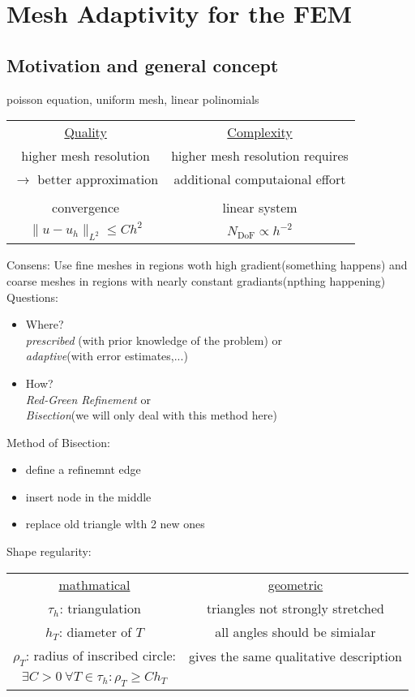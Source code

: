 \section{Mesh Adaptivity for the FEM}
\subsection{Motivation and general concept}

\begin{example}
	poisson equation, uniform mesh, linear polinomials
\end{example}

\begin{tabular}{c | c}
	\underline{Quality} & \underline{Complexity}\\
	higher mesh resolution & higher mesh resolution requires \\
	 $\to$ better approximation & additional computaional effort\\
	 & \\
	 convergence & linear system \\
	 $\|u-u_h\|_{L^2} \leq C h^2$ & $N_{\text{DoF}}\propto h^{-2}$
\end{tabular}

Consens: Use fine meshes in regions woth high gradient(something happens) and coarse meshes in regions with nearly constant gradiants(npthing happening)\\

Questions:
\begin{itemize}
	\item Where?\\
		\textit{prescribed} (with prior knowledge of the problem) or \\
		\textit{adaptive}(with error estimates,...)
	\item How?\\
		\textit{Red-Green Refinement} or \\
		\textit{Bisection}(we will only deal with this method here)
\end{itemize}

Method of Bisection:
\begin{itemize}
	\item define a refinemnt edge
	\item insert node in the middle
	\item replace old triangle wlth 2 new ones 
\end{itemize}

Shape regularity:\\
\begin{tabular}{c | c}
	\underline{mathmatical} & \underline{geometric}\\
	$\tau_h$:  triangulation & triangles not strongly stretched \\
	$h_T$:  diameter of $T$ & all angles should be \glqq simialar \grqq \\
	$\rho_T$:  radius of inscribed circle:	& gives the same qualitative description\\
	$\exists C > 0\ \forall T \in \tau_h \colon \rho_T \geq C h_T$ & 
\end{tabular}

